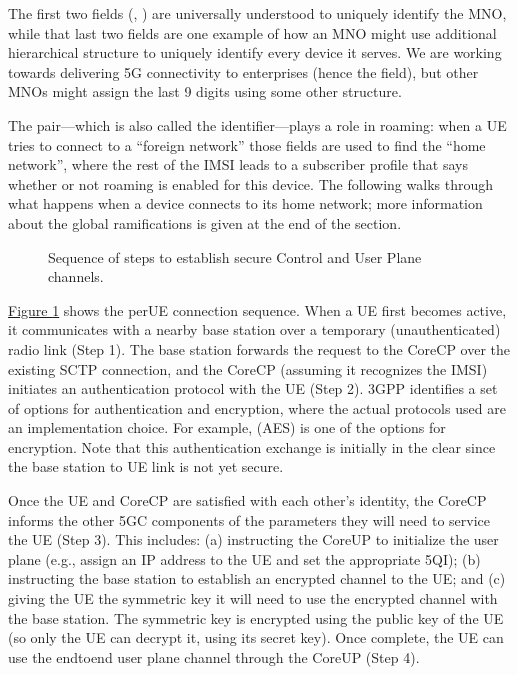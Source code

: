 \documentclass[a4paper,11pt,english]{sphinxmanual}
\let\sphinxpxdimen\pdfpxdimen\else\newdimen\sphinxpxdimen
\begin{document}
\sphinxAtStartPar
The first two fields (, ) are universally understood to
uniquely identify the MNO, while that last two fields are one example
of how an MNO might use additional hierarchical structure to uniquely
identify every device it serves. We are working towards delivering 5G
connectivity to enterprises (hence the  field), but other MNOs
might assign the last 9 digits using some other structure.

\sphinxAtStartPar
The  pair—which is also called the  identifier—plays a role in roaming: when a UE tries
to connect to a “foreign network” those fields are used to find the
“home network”, where the rest of the IMSI leads to a subscriber
profile that says whether or not roaming is enabled for this
device. The following walks through what happens when a device
connects to its home network; more information about the global
ramifications is given at the end of the section.

\begin{figure}[ht]
\centering
\capstart

\noindent\sphinxincludegraphics[width=600\sphinxpxdimen]{{Slide12}.png}
\caption{Sequence of steps to establish secure Control and User Plane
channels.}\label{\detokenize{arch:id13}}\label{\detokenize{arch:fig-secure}}\end{figure}

\sphinxAtStartPar
\hyperref[\detokenize{arch:fig-secure}]{Figure \ref{\detokenize{arch:fig-secure}}} shows the
per\sphinxhyphen{}UE connection sequence. When a UE first becomes active, it
communicates with a nearby base station over a temporary
(unauthenticated) radio link (Step 1). The base station forwards the
request to the Core\sphinxhyphen{}CP over the existing SCTP connection, and the
Core\sphinxhyphen{}CP (assuming it recognizes the IMSI) initiates an authentication
protocol with the UE (Step 2). 3GPP identifies a set of options for
authentication and encryption, where the actual protocols used are an
implementation choice. For example, 
(AES) is one of the options for encryption. Note that this
authentication exchange is initially in the clear since the base
station to UE link is not yet secure.

\sphinxAtStartPar
Once the UE and Core\sphinxhyphen{}CP are satisfied with each other’s identity, the
Core\sphinxhyphen{}CP informs the other 5GC components of the parameters they will need
to service the UE (Step 3). This includes: (a) instructing the Core\sphinxhyphen{}UP
to initialize the user plane (e.g., assign an IP address to the UE and
set the appropriate 5QI); (b) instructing the base station to
establish an encrypted channel to the UE; and (c) giving the UE the
symmetric key it will need to use the encrypted channel with the base
station. The symmetric key is encrypted using the public key of the
UE (so only the UE can decrypt it, using its secret key). Once
complete, the UE can use the end\sphinxhyphen{}to\sphinxhyphen{}end user plane channel through the
Core\sphinxhyphen{}UP (Step 4).
\end{document}
